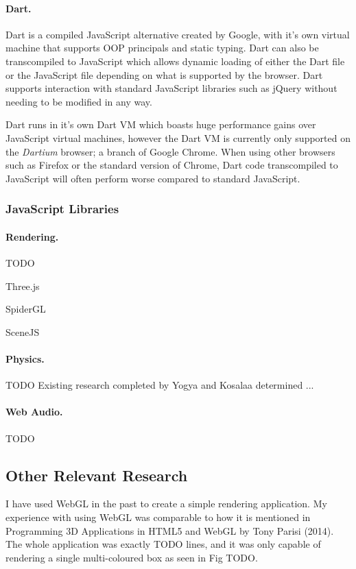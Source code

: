 \documentclass[a4paper, 12pt]{article}
\begin{document}
\paragraph{Dart.}
Dart is a compiled JavaScript alternative created by Google, with it's own virtual machine that supports OOP principals and static typing. Dart can also be transcompiled to JavaScript which allows dynamic loading of either the Dart file or the JavaScript file depending on what is supported by the browser.\cite{dart} Dart supports interaction with standard JavaScript libraries such as jQuery without needing to be modified in any way.

Dart runs in it's own Dart VM which boasts huge performance gains over JavaScript virtual machines, however the Dart VM is currently only supported on the \emph{Dartium} browser; a branch of Google Chrome. When using other browsers such as Firefox or the standard version of Chrome, Dart code transcompiled to JavaScript will often perform worse compared to standard JavaScript.\cite{dartperformance}

\subsubsection{JavaScript Libraries}

\paragraph{Rendering.}

TODO

Three.js

SpiderGL

SceneJS


\paragraph{Physics.}
TODO
Existing research completed by Yogya and Kosalaa determined ...



\paragraph{Web Audio.}
TODO

\subsection{Other Relevant Research}
I have used WebGL in the past to create a simple rendering application. My experience with using WebGL was comparable to how it is mentioned in Programming 3D Applications in HTML5 and WebGL by Tony Parisi (2014)\cite{parisi2014programming}. The whole application was exactly TODO lines, and it was only capable of rendering a single multi-coloured box as seen in Fig TODO.
\end{document}
